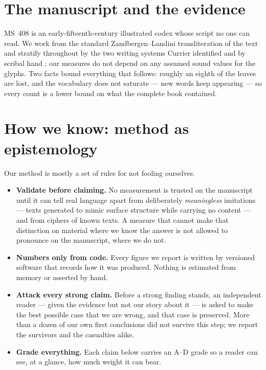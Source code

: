 \documentclass[11pt]{article}
\begin{document}
\section{The manuscript and the evidence}
MS~408 is an early-fifteenth-century illustrated codex whose script no one can read. We work from
the standard Zandbergen--Landini transliteration of the text \citep{zandbergen_voynichnu} and
stratify throughout by the two writing systems Currier identified \citep{currier1976} and by
scribal hand \citep{fagindavis2020hands}; our measures do not depend on any assumed sound values
for the glyphs. Two facts bound everything that follows: roughly an eighth of the leaves are lost,
and the vocabulary does not saturate --- new words keep appearing --- so every count is a lower
bound on what the complete book contained.

\section{How we know: method as epistemology}
Our method is mostly a set of rules for not fooling ourselves.
\begin{itemize}[leftmargin=1.2em,itemsep=1pt]
  \item \textbf{Validate before claiming.} No measurement is trusted on the manuscript until it
  can tell real language apart from deliberately \emph{meaningless} imitations --- texts generated
  to mimic surface structure while carrying no content --- and from ciphers of known texts. A
  measure that cannot make that distinction on material where we know the answer is not allowed to
  pronounce on the manuscript, where we do not.
  \item \textbf{Numbers only from code.} Every figure we report is written by versioned software
  that records how it was produced. Nothing is estimated from memory or asserted by hand.
  \item \textbf{Attack every strong claim.} Before a strong finding stands, an independent reader
  --- given the evidence but not our story about it --- is asked to make the best possible case
  that we are wrong, and that case is preserved. More than a dozen of our own first conclusions
  did not survive this step; we report the survivors and the casualties alike.
  \item \textbf{Grade everything.} Each claim below carries an A--D grade so a reader can see, at a
  glance, how much weight it can bear.
\end{itemize}
\end{document}
